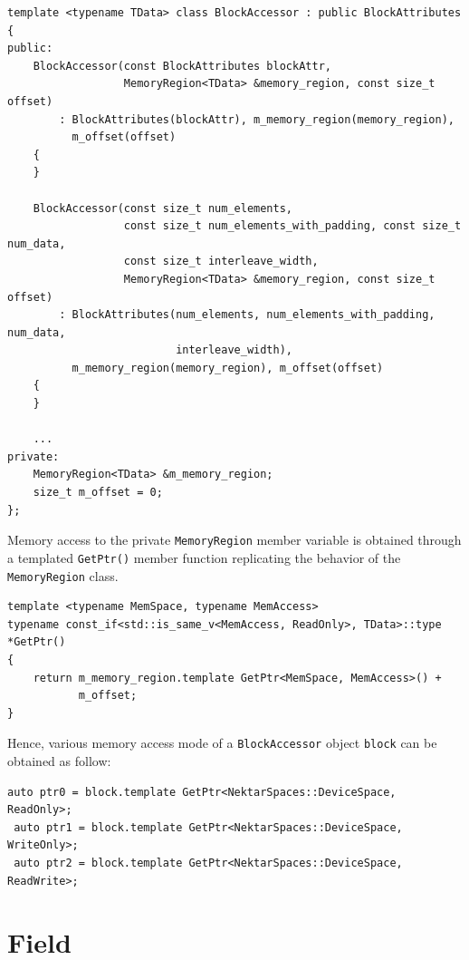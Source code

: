 \begin{lstlisting}[style=C++Style]
template <typename TData> class BlockAccessor : public BlockAttributes
{
public:
    BlockAccessor(const BlockAttributes blockAttr,
                  MemoryRegion<TData> &memory_region, const size_t offset)
        : BlockAttributes(blockAttr), m_memory_region(memory_region),
          m_offset(offset)
    {
    }

    BlockAccessor(const size_t num_elements,
                  const size_t num_elements_with_padding, const size_t num_data,
                  const size_t interleave_width,
                  MemoryRegion<TData> &memory_region, const size_t offset)
        : BlockAttributes(num_elements, num_elements_with_padding, num_data,
                          interleave_width),
          m_memory_region(memory_region), m_offset(offset)
    {
    }

    ...
private:
    MemoryRegion<TData> &m_memory_region;
    size_t m_offset = 0;
};
\end{lstlisting}

Memory access to the private \lstinline[style=C++Style]!MemoryRegion!
member variable is obtained through a templated
\lstinline[style=C++Style]!GetPtr()! member function replicating the
behavior of the \lstinline[style=C++Style]!MemoryRegion! class.
\begin{lstlisting}[style=C++Style]
template <typename MemSpace, typename MemAccess>
typename const_if<std::is_same_v<MemAccess, ReadOnly>, TData>::type *GetPtr()
{
    return m_memory_region.template GetPtr<MemSpace, MemAccess>() +
           m_offset;
}
\end{lstlisting}

Hence, various memory access mode of a
\lstinline[style=C++Style]!BlockAccessor! object
\lstinline[style=C++Style]!block! can be obtained as follow:
\begin{lstlisting}[style=C++Style]
 auto ptr0 = block.template GetPtr<NektarSpaces::DeviceSpace, ReadOnly>;
 auto ptr1 = block.template GetPtr<NektarSpaces::DeviceSpace, WriteOnly>;
 auto ptr2 = block.template GetPtr<NektarSpaces::DeviceSpace, ReadWrite>;
\end{lstlisting}


\section{Field}
